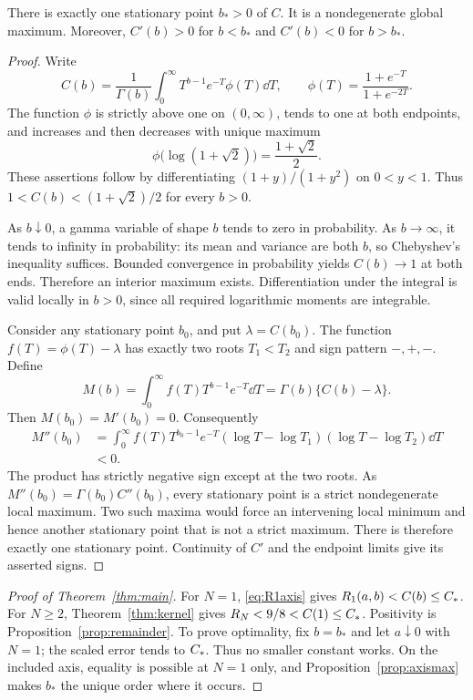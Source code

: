 \begin{proposition}\label{prop:axismax}
There is exactly one stationary point $b_*>0$ of $C$. It is a nondegenerate global maximum. Moreover, $C'(b)>0$ for $b<b_*$ and $C'(b)<0$ for $b>b_*$.
\end{proposition}
\begin{proof}
Write
\[
 C(b)=\frac1{\Gamma(b)}\int_0^\infty T^{b-1}e^{-T}\phi(T)\dd T,
 \qquad \phi(T)=\frac{1+e^{-T}}{1+e^{-2T}}.
\]
The function $\phi$ is strictly above one on $(0,\infty)$, tends to one at both endpoints, and increases and then decreases with unique maximum
\[
 \phi\bigl(\log(1+\sqrt2)\bigr)=\frac{1+\sqrt2}{2}.
\]
These assertions follow by differentiating $(1+y)/(1+y^2)$ on $0<y<1$. Thus
$1<C(b)<(1+\sqrt2)/2$ for every $b>0$.

As $b\downarrow0$, a gamma variable of shape $b$ tends to zero in probability. As $b\to\infty$, it tends to infinity in probability: its mean and variance are both $b$, so Chebyshev's inequality suffices. Bounded convergence in probability yields $C(b)\to1$ at both ends. Therefore an interior maximum exists. Differentiation under the integral is valid locally in $b>0$, since all required logarithmic moments are integrable.

Consider any stationary point $b_0$, and put $\lambda=C(b_0)$. The function $f(T)=\phi(T)-\lambda$ has exactly two roots $T_1<T_2$ and sign pattern $-,+,-$. Define
\[
 M(b)=\int_0^\infty f(T)T^{b-1}e^{-T}\dd T
      =\Gamma(b)\{C(b)-\lambda\}.
\]
Then $M(b_0)=M'(b_0)=0$. Consequently
\begin{align*}
 M''(b_0)
 &=\int_0^\infty f(T)T^{b_0-1}e^{-T}
       (\log T-\log T_1)(\log T-\log T_2)\dd T\\
 &<0.
\end{align*}
The product has strictly negative sign except at the two roots. As $M''(b_0)=\Gamma(b_0)C''(b_0)$, every stationary point is a strict nondegenerate local maximum. Two such maxima would force an intervening local minimum and hence another stationary point that is not a strict maximum. There is therefore exactly one stationary point. Continuity of $C'$ and the endpoint limits give its asserted signs.
\end{proof}

\begin{proof}[Proof of Theorem~\ref{thm:main}]
For $N=1$, \eqref{eq:R1axis} gives $R_1(a,b)<C(b)\le C_*$. For $N\ge2$, Theorem~\ref{thm:kernel} gives $R_N<9/8<C(1)\le C_*$. Positivity is Proposition~\ref{prop:remainder}. To prove optimality, fix $b=b_*$ and let $a\downarrow0$ with $N=1$; the scaled error tends to $C_*$. Thus no smaller constant works. On the included axis, equality is possible at $N=1$ only, and Proposition~\ref{prop:axismax} makes $b_*$ the unique order where it occurs.
\end{proof}

